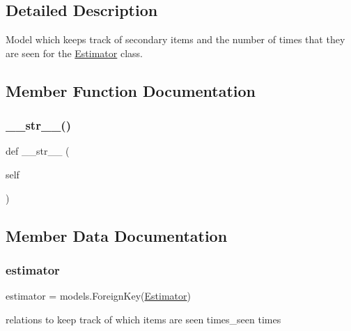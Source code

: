 \subsection{Detailed Description}
Model which keeps track of secondary items and the number of times that they are seen for the \mbox{\hyperlink{classjoinapp_1_1models_1_1estimator_1_1_estimator}{Estimator}} class. 



\subsection{Member Function Documentation}
\mbox{\label{classjoinapp_1_1models_1_1estimator_1_1_f_statistic_a23e8041ce1015febe4fdace3225714f9}} 
\subsubsection{\texorpdfstring{\_\_str\_\_()}{\_\_str\_\_()}}
{\footnotesize\ttfamily def \+\_\+\+\_\+str\+\_\+\+\_\+ (\begin{DoxyParamCaption}\item[{}]{self }\end{DoxyParamCaption})}



\subsection{Member Data Documentation}
\mbox{\label{classjoinapp_1_1models_1_1estimator_1_1_f_statistic_a3677c8fa8a597d36148ef4474e839158}} 
\subsubsection{\texorpdfstring{estimator}{estimator}}
{\footnotesize\ttfamily estimator = models.\+Foreign\+Key(\textquotesingle{}\mbox{\hyperlink{classjoinapp_1_1models_1_1estimator_1_1_estimator}{Estimator}}\textquotesingle{})\hspace{0.3cm}{\ttfamily [static]}}



relations to keep track of which items are seen times\+\_\+seen times 

